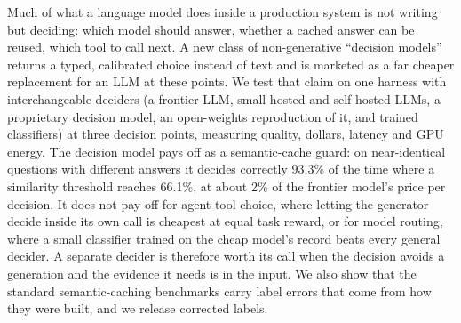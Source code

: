 Much of what a language model does inside a production system is not writing but deciding: which model should answer, whether a cached answer can be reused, which tool to call next.
A new class of non-generative ``decision models'' returns a typed, calibrated choice instead of text and is marketed as a far cheaper replacement for an LLM at these points.
We test that claim on one harness with interchangeable deciders (a frontier LLM, small hosted and self-hosted LLMs, a proprietary decision model, an open-weights reproduction of it, and trained classifiers) at three decision points, measuring quality, dollars, latency and GPU energy.
The decision model pays off as a semantic-cache guard: on near-identical questions with different answers it decides correctly 93.3\% of the time where a similarity threshold reaches 66.1\%, at about 2\% of the frontier model's price per decision.
It does not pay off for agent tool choice, where letting the generator decide inside its own call is cheapest at equal task reward, or for model routing, where a small classifier trained on the cheap model's record beats every general decider.
A separate decider is therefore worth its call when the decision avoids a generation and the evidence it needs is in the input.
We also show that the standard semantic-caching benchmarks carry label errors that come from how they were built, and we release corrected labels.
